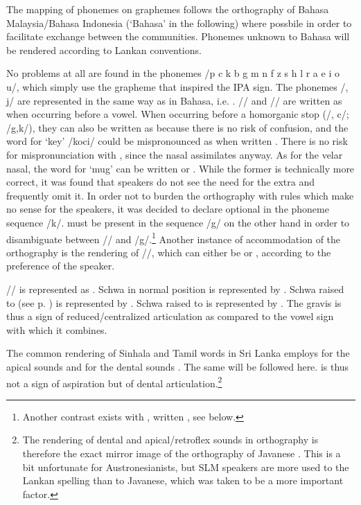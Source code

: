 The mapping of phonemes on graphemes follows the orthography of Bahasa   Malaysia/Bahasa Indonesia (`Bahasa' in the following) where possbile in order to facilitate exchange between the  communities. Phonemes unknown to Bahasa will be rendered according to Lankan conventions.

No problems at all are found in the phonemes /p c k b g  m n f z s h l r a e i o u/, which simply use the grapheme that inspired the IPA sign.
The phonemes /\J, j/ are represented in the same way as in Bahasa, i.e. . /\ny/ and  /\ng/ are written as  when occurring before a vowel. When occurring before a homorganic stop (/\J, c/; /g,k/), they can also be written as  because there is no risk of confusion, and the word for `key' /ko\ny ci/ could be mispronounced as  when written . There is no risk for mispronunciation with , since the nasal assimilates anyway. As for the velar nasal, the word for `mug' can be written   or . While the former is technically more correct, it was found that speakers do not see the need for the extra  and frequently omit it. In order not to burden the orthography with rules which make no sense for the speakers, it was decided to declare  optional in the phoneme sequence /\ng k/.  must be present in the sequence /\ng g/ on the other hand in order to disambiguate between /\ng/ and /\ng g/.\footnote{Another contrast exists with \phonem{\ng:}, written , see below.} Another instance of accommodation of the orthography is the rendering of /\V/, which can either be  or , according to the preference of the speaker.

/\textesh/ is represented as . Schwa in normal position is represented by . Schwa raised to  (see p. \pageref{ex:phon:rep:sIggar}) is represented by  . Schwa raised to  is represented by . The gravis is thus a sign of reduced/centralized articulation as compared to the vowel sign with which it combines.

The common rendering of Sinhala and Tamil words in Sri Lanka employs  for the apical sounds  and  for the dental sounds \phonem{\dentt, \dentd}. The same will be followed here.  is thus not a sign of aspiration but of dental articulation.\footnote{The rendering of dental and apical/retroflex sounds in orthography is therefore the exact mirror image of the orthography of Javanese \citep[10]{Robson1992}. This is a bit unfortunate for Austronesianists, but SLM speakers are more used to the Lankan spelling than to Javanese, which was taken to be  a more important factor.}

